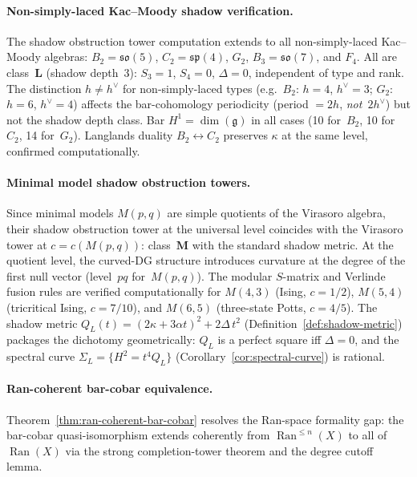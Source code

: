 \paragraph{Non-simply-laced Kac--Moody shadow verification.}
The shadow obstruction tower computation extends to all non-simply-laced
Kac--Moody algebras: $B_2 = \mathfrak{so}(5)$, $C_2 = \mathfrak{sp}(4)$,
$G_2$, $B_3 = \mathfrak{so}(7)$, and $F_4$.
All are class~$\mathbf{L}$ (shadow depth~$3$): $S_3 = 1$, $S_4 = 0$,
$\Delta = 0$, independent of type and rank. The distinction
$h \neq h^\vee$ for non-simply-laced types (e.g.\ $B_2$: $h = 4$,
$h^\vee = 3$; $G_2$: $h = 6$, $h^\vee = 4$) affects the bar-cohomology
periodicity (period $= 2h$, \emph{not}~$2h^\vee$) but not the
shadow depth class. Bar $H^1 = \dim(\mathfrak{g})$ in all cases
(10 for~$B_2$, 10 for~$C_2$, 14 for~$G_2$).
Langlands duality $B_2 \leftrightarrow C_2$ preserves
$\kappa$ at the same level, confirmed computationally.

\paragraph{Minimal model shadow obstruction towers.}
Since minimal models $M(p,q)$ are simple quotients of the
Virasoro algebra, their shadow obstruction tower at the universal level
coincides with the Virasoro tower at $c = c(M(p,q))$:
class~$\mathbf{M}$ with the standard shadow metric.
At the quotient level, the curved-DG structure introduces
curvature at the degree of the first null vector (level~$pq$
for~$M(p,q)$). The modular $S$-matrix and Verlinde fusion
rules are verified computationally for $M(4,3)$ (Ising, $c = 1/2$),
$M(5,4)$ (tricritical Ising, $c = 7/10$),
and $M(6,5)$ (three-state Potts, $c = 4/5$).
The shadow metric
$Q_L(t) = (2\kappa + 3\alpha t)^2 + 2\Delta\,t^2$
(Definition~\ref{def:shadow-metric}) packages the dichotomy
geometrically: $Q_L$ is a perfect square iff
$\Delta = 0$, and the spectral curve
$\Sigma_L = \{H^2 = t^4 Q_L\}$
(Corollary~\ref{cor:spectral-curve}) is rational.

\paragraph{Ran-coherent bar-cobar equivalence.}
Theorem~\ref{thm:ran-coherent-bar-cobar} resolves the Ran-space
formality gap: the bar-cobar
quasi-isomorphism extends coherently from
$\operatorname{Ran}^{\leq n}(X)$ to all of
$\operatorname{Ran}(X)$ via the strong completion-tower theorem
and the degree cutoff lemma.

